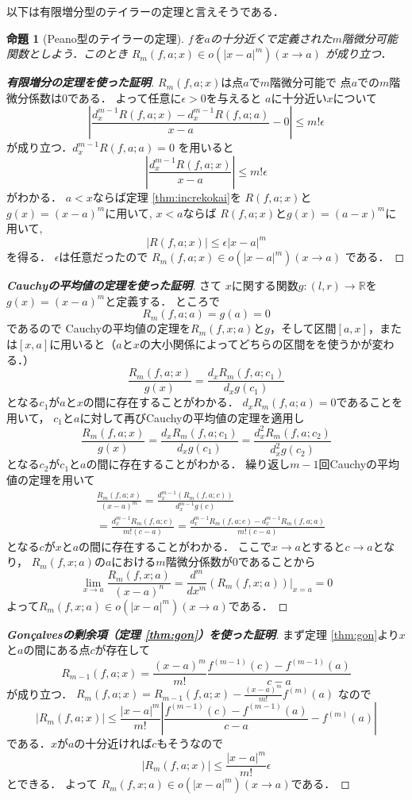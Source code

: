 \documentclass[leqno, a4paper, 12pt]{jsarticle}
\newtheorem{prop}[thm]{命題}
\newcommand{\rr}{\mathbb{R}}
\newcommand{\bbb}[2]{#1^{(#2)}}
\begin{document}
以下は有限増分型のテイラーの定理と言えそうである．
\begin{prop}[Peano型のテイラーの定理]
$f$を$a$の十分近くで定義された$m$階微分可能関数としよう．このとき
$R_m(f, a; x)\in o(|x-a|^m)(x\to a)$
が成り立つ．
\end{prop}
\begin{proof}[\textbf{有限増分の定理を使った証明}]
$R_{m}(f, a; x)$は点$a$で$m$階微分可能で
点$a$での$m$階微分係数は$0$である．
よって任意に$\epsilon>0$を与えると
$a$に十分近い$x$について
\[
\left|\frac{d_{x}^{m-1}R(f, a; x)-d_{x}^{m-1}R(f, a; a)}{x-a}-0\right|\le m!\epsilon
\]
が成り立つ．$d_{x}^{m-1}R(f, a; a)=0$
を用いると
\[
\left|\frac{d_{x}^{m-1}R(f, a; x)}{x-a}\right|\le m!\epsilon
\]
がわかる．
$a<x$ならば定理 \ref{thm:increkokai}を
$R(f, a; x)$と$g(x)=(x-a)^{m}$に用いて, 
$x<a$ならば
$R(f, a; x)$と$g(x)=(a-x)^{m}$に用いて, 
\[
|R(f, a; x)|\le \epsilon|x-a|^{m}
\]
を得る．
$\epsilon$は任意だったので
$R_m(f, a; x)\in o(|x-a|^m)(x\to a)$
 である．
\end{proof}
\begin{proof}[\textbf{Cauchyの平均値の定理を使った証明}]
さて
$x$に関する関数$g:(l,r)\to \rr$を$g(x)=(x-a)^m$と定義する．
ところで
\[
R_m(f,a;a)=g(a)=0
\]
であるので
Cauchyの平均値の定理を$R_m(f,x;a)$と$g$，そして区間$[a,x]$，または$[x,a]$に用いると（$a$と$x$の大小関係によってどちらの区間をを使うかが変わる．）
\[
\frac{R_m(f, a; x)}{g(x)}=\frac{d_{x}R_{m}(f, a; c_1)}{d_{x}g(c_1)}
\]
となる$c_1$が$a$と$x$の間に存在することがわかる．
$d_xR_{m}(f,a;a)=0$であることを用いて，
$c_1$と$a$に対して再びCauchyの平均値の定理を適用し
\[
\frac{R_m(f, a; x)}{g(x)}=\frac{d_xR_{m}(f, a; c_1)}{d_xg(c_1)}=\frac{d_x^2R_{m}(f, a; c_2)}{d_x^2g(c_2)}
\]
となる$c_2$が$c_1$と$a$の間に存在することがわかる．
繰り返し$m-1$回Cauchyの平均値の定理を用いて
\begin{align*}
&\frac{R_m(f, a;x)}{(x-a)^m}=\frac{d_x^{m-1}(R_m(f, a; c))}{d_x^{m-1}g(c)}\\
&=\frac{d_x^{m-1}R_{m}(f, a; c)}{m!(c-a)}
=\frac{d_x^{m-1}R_m(f, a; c)-d_x^{m-1}R_{m}(f,a;a)}{m!(c-a)}
\end{align*}
となる$c$が$x$と$a$の間に存在することがわかる．
ここで$x\to a$とすると$c\to a$となり，
$R_m(f,x;a)$の$a$における$m$階微分係数が$0$であることから
\[
\lim_{x\to a}\frac{R_m(f,x;a)}{(x-a)^n}=\frac{d^m}{dx^m}(R_m(f,x;a))|_{x=a}=0
\]
よって$R_m(f, x;a)\in o(|x-a|^m)(x\to a)$である．
\end{proof}
\begin{proof}[\textbf{Gon\c{c}alvesの剰余項（定理 \ref{thm:gon}）を使った証明}]
まず定理 \ref{thm:gon}より$x$と$a$の間にある点$c$が存在して
\[
R_{m-1}(f, a; x)=\frac{(x-a)^{m}}{m!}\frac{\bbb{f}{m-1}(c)-\bbb{f}{m-1}(a)}{c-a}
\]
が成り立つ．
$R_{m}(f, a; x)=R_{m-1}(f, a; x)-\frac{(x-a)^m}{m!}\bbb{f}{m}(a)$
なので
\[
|R_{m}(f, a; x)|
\le 
\frac{|x-a|^m}{m!}
\left|
\frac{\bbb{f}{m-1}(c)-\bbb{f}{m-1}(a)}{c-a}
-
\bbb{f}{m}(a)
\right|
\]
である．$x$が$a$の十分近ければ$c$もそうなので
\[
|R_{m}(f, a; x)|
\le 
\frac{|x-a|^m}{m!}\epsilon
\]
とできる．
よって
$R_m(f, x;a)\in o(|x-a|^m)(x\to a)$である．
\end{proof}
\end{document}
